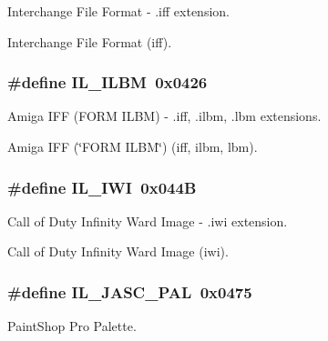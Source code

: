 Interchange File Format -\/ .iff extension. 

Interchange File Format (iff). \hypertarget{group__il__formats_gad519dac007bd705c82194d808f4b37c1}{
\subsubsection[{I\+L\+\_\+\+I\+L\+B\+M}]{\setlength{\rightskip}{0pt plus 5cm}\#define I\+L\+\_\+\+I\+L\+B\+M~0x0426}}\label{group__il__formats_gad519dac007bd705c82194d808f4b37c1}


Amiga I\+F\+F (F\+O\+R\+M I\+L\+B\+M) -\/ .iff, .ilbm, .lbm extensions. 

Amiga I\+F\+F (\char`\"{}\+F\+O\+R\+M I\+L\+B\+M\char`\"{}) (iff, ilbm, lbm). \hypertarget{group__il__formats_ga1024c13c5d848c827bc70998d4559b36}{
\subsubsection[{I\+L\+\_\+\+I\+W\+I}]{\setlength{\rightskip}{0pt plus 5cm}\#define I\+L\+\_\+\+I\+W\+I~0x044\+B}}\label{group__il__formats_ga1024c13c5d848c827bc70998d4559b36}


Call of Duty Infinity Ward Image -\/ .iwi extension. 

Call of Duty Infinity Ward Image (iwi). \hypertarget{group__il__formats_ga45aea262f25a3a0e5445c4d114e1851e}{
\subsubsection[{I\+L\+\_\+\+J\+A\+S\+C\+\_\+\+P\+A\+L}]{\setlength{\rightskip}{0pt plus 5cm}\#define I\+L\+\_\+\+J\+A\+S\+C\+\_\+\+P\+A\+L~0x0475}}\label{group__il__formats_ga45aea262f25a3a0e5445c4d114e1851e}


Paint\+Shop Pro Palette. 

